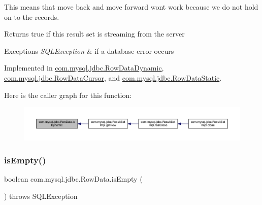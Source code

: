 This means that move back and move forward won\textquotesingle{}t work because we do not hold on to the records.

\begin{DoxyReturn}{Returns}
true if this result set is streaming from the server 
\end{DoxyReturn}

\begin{DoxyExceptions}{Exceptions}
{\em S\+Q\+L\+Exception} & if a database error occurs \\
\hline
\end{DoxyExceptions}


Implemented in \mbox{\hyperlink{classcom_1_1mysql_1_1jdbc_1_1_row_data_dynamic_a82708299ee9a3ef5ebcab85a59ba9c70}{com.\+mysql.\+jdbc.\+Row\+Data\+Dynamic}}, \mbox{\hyperlink{classcom_1_1mysql_1_1jdbc_1_1_row_data_cursor_a181d924b1f4a28875db321305489f179}{com.\+mysql.\+jdbc.\+Row\+Data\+Cursor}}, and \mbox{\hyperlink{classcom_1_1mysql_1_1jdbc_1_1_row_data_static_a4134efd887590ba3a57bb862079c7491}{com.\+mysql.\+jdbc.\+Row\+Data\+Static}}.

Here is the caller graph for this function\+:
\nopagebreak
\begin{figure}[H]
\begin{center}
\leavevmode
\includegraphics[width=350pt]{interfacecom_1_1mysql_1_1jdbc_1_1_row_data_a0205c4297c795afb968d714a56272e01_icgraph}
\end{center}
\end{figure}
\mbox{\label{interfacecom_1_1mysql_1_1jdbc_1_1_row_data_afe25c16468d9db9d9458db7b1c6004f1}} 
\subsubsection{\texorpdfstring{is\+Empty()}{isEmpty()}}
{\footnotesize\ttfamily boolean com.\+mysql.\+jdbc.\+Row\+Data.\+is\+Empty (\begin{DoxyParamCaption}{ }\end{DoxyParamCaption}) throws S\+Q\+L\+Exception}

